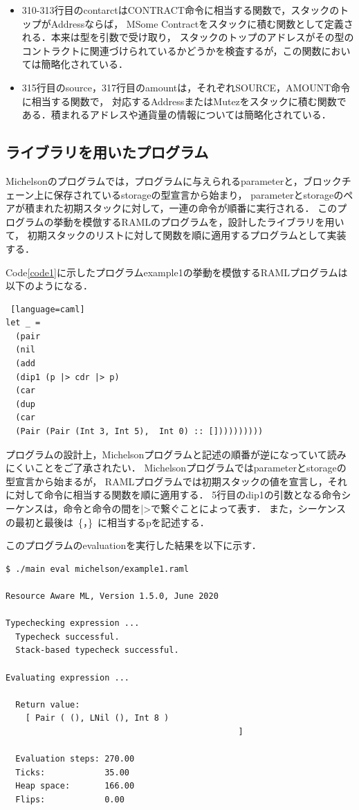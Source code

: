 \documentclass{kuisthesis}
\begin{document}
\begin{itemize}
  \item 310-313行目のcontarctはCONTRACT命令に相当する関数で，スタックのトップがAddressならば，
  MSome Contractをスタックに積む関数として定義される．本来は型を引数で受け取り，
  スタックのトップのアドレスがその型のコントラクトに関連づけられているかどうかを検査するが，この関数においては簡略化されている．
  \item 315行目のsource，317行目のamountは，それぞれSOURCE，AMOUNT命令に相当する関数で，
  対応するAddressまたはMutezをスタックに積む関数である．積まれるアドレスや通貨量の情報については簡略化されている．
\end{itemize}

\subsection{ライブラリを用いたプログラム} \label{subsec-pro-pro}
Michelsonのプログラムでは，プログラムに与えられるparameterと，ブロックチェーン上に保存されているstorageの型宣言から始まり，
parameterとstorageのペアが積まれた初期スタックに対して，一連の命令が順番に実行される．
このプログラムの挙動を模倣するRAMLのプログラムを，設計したライブラリを用いて，
初期スタックのリストに対して関数を順に適用するプログラムとして実装する．

Code\ref{code1}に示したプログラムexample1の挙動を模倣するRAMLプログラムは以下のようになる．
\\
\begin{lstlisting} [language=caml]
let _ =
  (pair
  (nil
  (add
  (dip1 (p |> cdr |> p)
  (car
  (dup
  (car
  (Pair (Pair (Int 3, Int 5),  Int 0) :: [])))))))))
\end{lstlisting}

プログラムの設計上，Michelsonプログラムと記述の順番が逆になっていて読みにくいことをご了承されたい．
Michelsonプログラムではparameterとstorageの型宣言から始まるが，
RAMLプログラムでは初期スタックの値を宣言し，それに対して命令に相当する関数を順に適用する．
5行目のdip1の引数となる命令シーケンスは，命令と命令の間を|>で繋ぐことによって表す．
また，シーケンスの最初と最後は\ \{，\}\ に相当するpを記述する．

このプログラムのevaluationを実行した結果を以下に示す．
\\
\begin{lstlisting}[basicstyle={\ttfamily\color{base}\scriptsize}]
$ ./main eval michelson/example1.raml

Resource Aware ML, Version 1.5.0, June 2020

Typechecking expression ...
  Typecheck successful.
  Stack-based typecheck successful.

Evaluating expression ...

  Return value:
    [ Pair ( (), LNil (), Int 8 )
                                               ]

  Evaluation steps: 270.00
  Ticks:            35.00
  Heap space:       166.00
  Flips:            0.00
\end{lstlisting}
\end{document}
